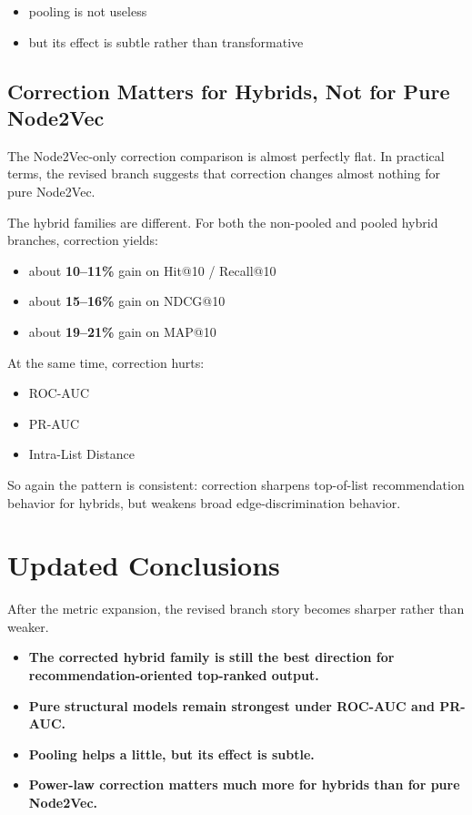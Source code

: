 \documentclass[11pt,a4paper]{article}
\begin{document}
\begin{itemize}
    \item pooling is not useless
    \item but its effect is subtle rather than transformative
\end{itemize}

\subsection{Correction Matters for Hybrids, Not for Pure Node2Vec}
The Node2Vec-only correction comparison is almost perfectly flat. In practical
terms, the revised branch suggests that correction changes almost nothing for
pure Node2Vec.

The hybrid families are different. For both the non-pooled and pooled hybrid
branches, correction yields:

\begin{itemize}
    \item about \textbf{10--11\%} gain on Hit@10 / Recall@10
    \item about \textbf{15--16\%} gain on NDCG@10
    \item about \textbf{19--21\%} gain on MAP@10
\end{itemize}

At the same time, correction hurts:

\begin{itemize}
    \item ROC-AUC
    \item PR-AUC
    \item Intra-List Distance
\end{itemize}

So again the pattern is consistent: correction sharpens top-of-list
recommendation behavior for hybrids, but weakens broad edge-discrimination
behavior.

\section{Updated Conclusions}
After the metric expansion, the revised branch story becomes sharper rather
than weaker.

\begin{itemize}
    \item \textbf{The corrected hybrid family is still the best direction for
          recommendation-oriented top-ranked output.}
    \item \textbf{Pure structural models remain strongest under ROC-AUC and
          PR-AUC.}
    \item \textbf{Pooling helps a little, but its effect is subtle.}
    \item \textbf{Power-law correction matters much more for hybrids than for
          pure Node2Vec.}
\end{itemize}
\end{document}
